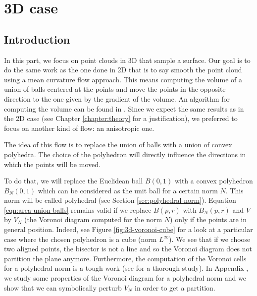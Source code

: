 

\chapter{3D case}
\label{chapter:3d}

\section{Introduction}

In this part, we focus on point clouds in 3D that sample a surface. Our goal is
to do the same work as the one done in 2D that is to say smooth the point cloud
using a mean curvature flow approach. This means computing the volume of a union
of balls centered at the points and move the points in the opposite direction to
the one given by the gradient of the volume. An algorithm for computing the
volume can be found in \cite{cazals2011computing}. Since we expect the same
results as in the 2D case (see Chapter \ref{chapter:theory} for a
justification), we preferred to focus on another kind of flow: an anisotropic
one.

The idea of this flow is to replace the union of balls with a union of convex
polyhedra. The choice of the polyhedron will directly influence the directions
in which the points will be moved.

To do that, we will replace the Euclidean ball $ B(0, 1) $ with a convex
polyhedron $ B_N(0, 1) $ which can be considered as the unit ball for a certain
norm $ N $. This norm will be called polyhedral (see Section
\ref{sec:polyhedral-norm}). Equation \eqref{eqn:area-union-balls} remains valid
if we replace $ B(p, r) $ with $ B_N(p, r) $ and $ V $ by $ V_N $ (the Voronoi
diagram computed for the norm $ N $) only if the points are in general position.
Indeed, see Figure \ref{fig:3d-voronoi-cube} for a look at a particular case
where the chosen polyhedron is a cube (norm $ L^\infty $). We see that if we
choose two aligned points, the bisector is not a line and so the Voronoi diagram
does not partition the plane anymore. Furthermore, the computation of the
Voronoi cells for a polyhedral norm is a tough work (see \cite{ma2000bisectors}
for a thorough study). In Appendix
, we study some properties of the
Voronoi diagram for a polyhedral norm and we show that we can symbolically
perturb $ V_N $ in order to get a partition.

